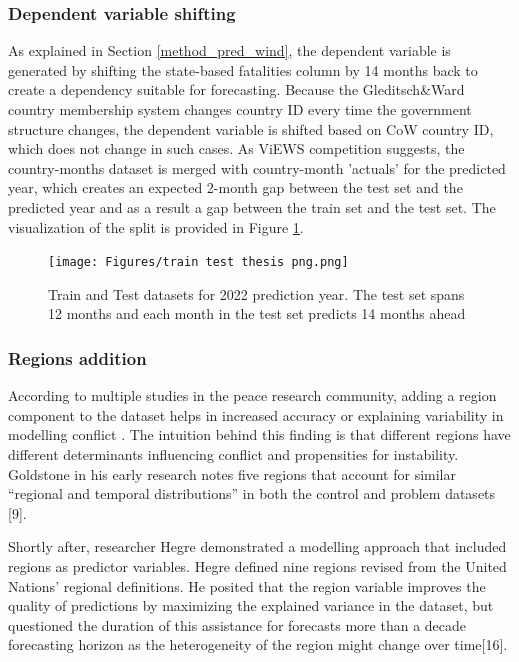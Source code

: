 \documentclass[runningheads]{llncs}
\begin{document}
    \subsubsection{Dependent variable shifting}
    As explained in Section \ref{method_pred_wind}, the dependent variable is generated by shifting the state-based fatalities column by 14 months back to create a dependency suitable for forecasting. Because the Gleditsch\&Ward country membership system changes country ID every time the government structure changes, the dependent variable is shifted based on CoW country ID, which does not change in such cases. As ViEWS competition suggests, the country-months dataset is merged with country-month 'actuals' for the predicted year, which creates an expected 2-month gap between the test set and the predicted year and as a result a gap between the train set and the test set. The visualization of the split is provided in Figure \ref{train_test_split}.

    \begin{figure}[h]
        \texttt{[image: Figures/train test thesis png.png]}
        \centering
        \caption{Train and Test datasets for 2022 prediction year. The test set spans 12 months and each month in the test set predicts 14 months ahead}
        \label{train_test_split}
    \end{figure}

    \subsubsection{Regions addition}
    According to multiple studies in the peace research community, adding a region component to the dataset helps in increased accuracy or explaining variability in modelling conflict . The intuition behind this finding is that different regions have different determinants influencing conflict and propensities for instability. Goldstone in his early research notes five regions that account for similar “regional and temporal distributions” in both the control and problem datasets [9].

    Shortly after, researcher Hegre demonstrated a modelling approach that included
    regions as predictor variables. Hegre defined nine regions revised from the United Nations’ regional definitions. He posited that the region variable improves the quality of predictions by maximizing the explained variance in the dataset, but questioned the duration of this assistance for forecasts more than a decade forecasting horizon as the heterogeneity of the region might change over time[16].
\end{document}
